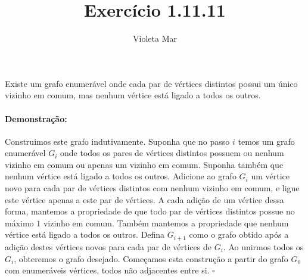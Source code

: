 \documentclass[11pt]{article}
\title{Exercício 1.11.11}
\author{Violeta Mar}
\date{}
\newcommand{\pulinho}{\vspace{.5cm}}
\theoremstyle{definition}
\theoremstyle{definition}
\theoremstyle{definition}
\theoremstyle{definition}
\newtheorem*{prop*}{Proposição}
\newenvironment{proposicao*}{
\definecolor{shadecolor}{HTML}{FFDBDF}
\begin{shaded}
\begin{prop*}
}
{
\end{prop*}
\end{shaded}
}
\theoremstyle{definition}
\theoremstyle{definition}
\theoremstyle{definition}
\theoremstyle{definition}
\theoremstyle{definition}
\theoremstyle{definition}
\theoremstyle{definition}
\theoremstyle{definition}
\newenvironment{prova}{\paragraph{Demonstração:}}{\hfill$\square$ 
\pulinho
}
\theoremstyle{definition}
\begin{document}
\maketitle

\begin{proposicao*}
Existe um grafo enumerável onde cada par de vértices distintos possui um único vizinho em comum, mas nenhum vértice está ligado a todos os outros.
\end{proposicao*}

\begin{prova}
Construimos este grafo indutivamente. Suponha que no passo $i$ temos um grafo enumerável $G_i$ onde todos os pares de vértices distintos possuem ou nenhum vizinho em comum ou apenas um vizinho em comum. Suponha também que nenhum vértice está ligado a todos os outros. Adicione ao grafo $G_i$ um vértice novo para cada par de vértices distintos com nenhum vizinho em comum, e ligue este vértice apenas a este par de vértices. A cada adição de um vértice dessa forma, mantemos a propriedade de que todo par de vértices distintos possue no máximo $1$ vizinho em comum. Também mantemos a propriedade que nenhum vértice está ligado a todos os outros. Defina $G_{i+1}$ como o grafo obtido após a adição destes vértices novos para cada par de vértices de $G_i$. Ao unirmos todos os $G_i$, obteremos o grafo desejado. Começamos esta construção a partir do grafo $G_0$ com enumeráveis vértices, todos não adjacentes entre si. 
\end{prova}
\end{document}
